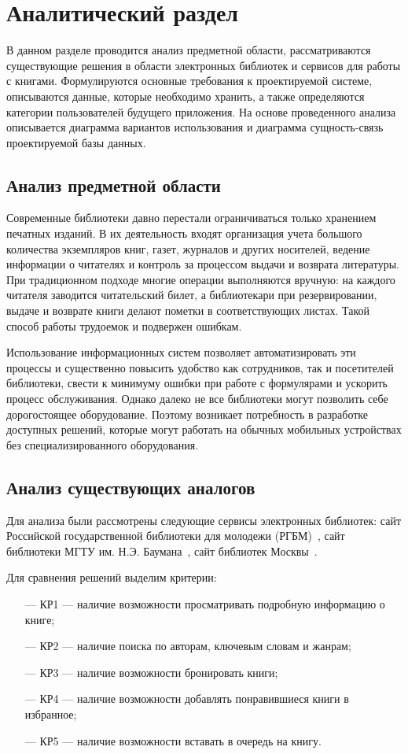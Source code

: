 \chapter{Аналитический раздел}

В данном разделе проводится анализ предметной области, рассматриваются существующие решения в области электронных библиотек и сервисов для работы с книгами. Формулируются основные требования к проектируемой системе, описываются данные, которые необходимо хранить, а также определяются категории пользователей будущего приложения. На основе проведенного анализа описывается диаграмма вариантов использования и диаграмма сущность-связь проектируемой базы данных.

\section{Анализ предметной области}
Современные библиотеки давно перестали ограничиваться только хранением печатных изданий. В их деятельность входят организация учета большого количества экземпляров книг, газет, журналов и других носителей, ведение информации о читателях и контроль за процессом выдачи и возврата литературы. При традиционном подходе многие операции выполняются вручную: на каждого читателя заводится читательский билет, а библиотекари при резервировании, выдаче и возврате книги делают пометки в соответствующих листах. Такой способ работы трудоемок и подвержен ошибкам. 

Использование информационных систем позволяет автоматизировать эти процессы и существенно повысить удобство как сотрудников, так и посетителей библиотеки, свести к минимуму ошибки при работе с формулярами и ускорить процесс обслуживания. Однако далеко не все библиотеки могут позволить себе дорогостоящее оборудование. Поэтому возникает потребность в разработке доступных решений, которые могут работать на обычных мобильных устройствах без специализированного оборудования.

\section{Анализ существующих аналогов}
Для анализа были рассмотрены следующие сервисы электронных библиотек: сайт Российской государственной библиотеки для молодежи (РГБМ)~\cite{РГБМ}, сайт библиотеки МГТУ им. Н.Э. Баумана~\cite{МГТУ}, сайт библиотек Москвы~\cite{Moscow}.

Для сравнения решений выделим критерии:
\begin{itemize}
    \item[---] КР1 --- наличие возможности просматривать подробную информацию о книге;
    \item[---] КР2 --- наличие поиска по авторам, ключевым словам и жанрам;
    \item[---] КР3 --- наличие возможности бронировать книги;
    \item[---] КР4 --- наличие возможности добавлять понравившиеся книги в избранное;
    \item[---] КР5 --- наличие возможности вставать в очередь на книгу. 
\end{itemize}

